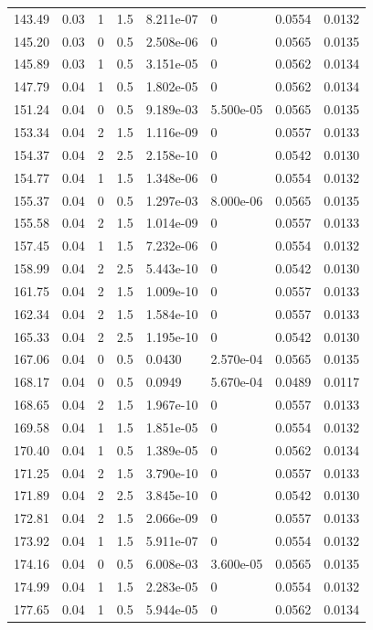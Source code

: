 \documentclass[preview]{standalone}
\begin{document}
{{{\begin{tabular}{L{1.2cm}C{1.2cm} C{0.3cm}C{0.5cm} C{1.4cm}C{1.4cm} C{1.4cm}C{1.4cm}}
  143.49  &  0.03  & 1     & 1.5 &  8.211e-07  & 0  & 0.0554 &  0.0132   \\ 
  145.20  &  0.03  & 0     & 0.5 &  2.508e-06  & 0  & 0.0565 &  0.0135   \\ 
  145.89  &  0.03  & 1     & 0.5 &  3.151e-05  & 0  & 0.0562 &  0.0134   \\ 
  147.79  &  0.04  & 1     & 0.5 &  1.802e-05  & 0  & 0.0562 &  0.0134   \\ 
  151.24  &  0.04  & 0     & 0.5 &  9.189e-03  & 5.500e-05  & 0.0565 &  0.0135   \\ 
  153.34  &  0.04  & 2     & 1.5 &  1.116e-09  & 0  & 0.0557 &  0.0133   \\ 
  154.37  &  0.04  & 2     & 2.5 &  2.158e-10  & 0  & 0.0542 &  0.0130   \\ 
  154.77  &  0.04  & 1     & 1.5 &  1.348e-06  & 0  & 0.0554 &  0.0132   \\ 
  155.37  &  0.04  & 0     & 0.5 &  1.297e-03  & 8.000e-06  & 0.0565 &  0.0135   \\ 
  155.58  &  0.04  & 2     & 1.5 &  1.014e-09  & 0  & 0.0557 &  0.0133   \\ 
  157.45  &  0.04  & 1     & 1.5 &  7.232e-06  & 0  & 0.0554 &  0.0132   \\ 
  158.99  &  0.04  & 2     & 2.5 &  5.443e-10  & 0  & 0.0542 &  0.0130   \\ 
  161.75  &  0.04  & 2     & 1.5 &  1.009e-10  & 0  & 0.0557 &  0.0133   \\ 
  162.34  &  0.04  & 2     & 1.5 &  1.584e-10  & 0  & 0.0557 &  0.0133   \\ 
  165.33  &  0.04  & 2     & 2.5 &  1.195e-10  & 0  & 0.0542 &  0.0130   \\ 
  167.06  &  0.04  & 0     & 0.5 &  0.0430  & 2.570e-04  & 0.0565 &  0.0135   \\ 
  168.17  &  0.04  & 0     & 0.5 &  0.0949  & 5.670e-04  & 0.0489 &  0.0117   \\ 
  168.65  &  0.04  & 2     & 1.5 &  1.967e-10  & 0  & 0.0557 &  0.0133   \\ 
  169.58  &  0.04  & 1     & 1.5 &  1.851e-05  & 0  & 0.0554 &  0.0132   \\ 
  170.40  &  0.04  & 1     & 0.5 &  1.389e-05  & 0  & 0.0562 &  0.0134   \\ 
  171.25  &  0.04  & 2     & 1.5 &  3.790e-10  & 0  & 0.0557 &  0.0133   \\ 
  171.89  &  0.04  & 2     & 2.5 &  3.845e-10  & 0  & 0.0542 &  0.0130   \\ 
  172.81  &  0.04  & 2     & 1.5 &  2.066e-09  & 0  & 0.0557 &  0.0133   \\ 
  173.92  &  0.04  & 1     & 1.5 &  5.911e-07  & 0  & 0.0554 &  0.0132   \\ 
  174.16  &  0.04  & 0     & 0.5 &  6.008e-03  & 3.600e-05  & 0.0565 &  0.0135   \\ 
  174.99  &  0.04  & 1     & 1.5 &  2.283e-05  & 0  & 0.0554 &  0.0132   \\ 
  177.65  &  0.04  & 1     & 0.5 &  5.944e-05  & 0  & 0.0562 &  0.0134   \\ 
\hline 
\end{tabular} 

}}}
\end{document}
